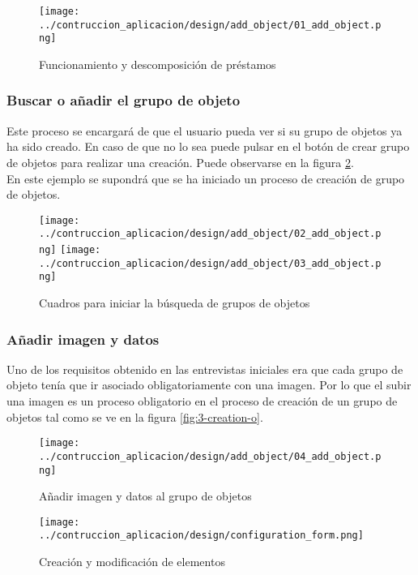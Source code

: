 \begin{figure}[ht]
    \centering
    \texttt{[image: ../contruccion\_aplicacion/design/add\_object/01\_add\_object.png]}
    \caption{Funcionamiento y descomposición de préstamos}\label{fig:1-creation-o}
\end{figure}

\subsubsection{Buscar o añadir el grupo de objeto}
Este proceso se encargará de que el usuario pueda ver si su grupo de objetos ya ha sido creado. En caso de que no lo sea puede pulsar en el botón de crear grupo de objetos para realizar una creación. Puede observarse en la figura \ref{fig:2-creation-o}.
\\En este ejemplo se supondrá que se ha iniciado un proceso de creación de grupo de objetos.

\begin{figure}[ht]
    \centering
    \texttt{[image: ../contruccion\_aplicacion/design/add\_object/02\_add\_object.png]}
    \texttt{[image: ../contruccion\_aplicacion/design/add\_object/03\_add\_object.png]}
    \caption{Cuadros para iniciar la búsqueda de grupos de objetos}\label{fig:2-creation-o}
\end{figure}

\subsubsection{Añadir imagen y datos}
Uno de los requisitos obtenido en las entrevistas iniciales era que cada grupo de objeto tenía que ir asociado obligatoriamente con una imagen. Por lo que el subir una imagen es un proceso obligatorio en el proceso de creación de un grupo de objetos tal como se ve en la figura \ref{fig:3-creation-o}.

\begin{figure}[ht]
    \begin{minipage}{0.48\textwidth}
        \centering
        \texttt{[image: ../contruccion\_aplicacion/design/add\_object/04\_add\_object.png]}
        \caption{Añadir imagen y datos al grupo de objetos}\label{fig:3-creation-o}
    \end{minipage}\hfill
    \begin{minipage}{0.48\textwidth}
        \centering
        \texttt{[image: ../contruccion\_aplicacion/design/configuration\_form.png]}
        \caption{Creación y modificación de elementos}\label{fig:creation-and-modification}
    \end{minipage}
\end{figure}

